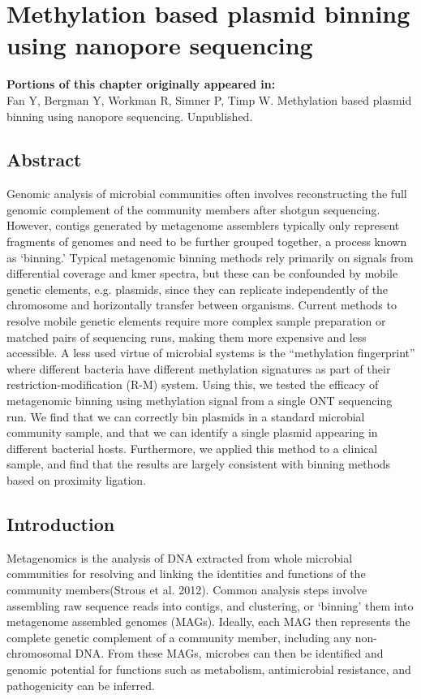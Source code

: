 \chapter{Methylation based plasmid binning using nanopore sequencing}
\label{chap:mdr}

\textbf{Portions of this chapter originally appeared in:} \\
Fan Y, Bergman Y, Workman R, Simner P, Timp W. Methylation based plasmid binning using nanopore sequencing. Unpublished.

\section{Abstract}
\label{sec:abstract}

Genomic analysis of microbial communities often involves reconstructing the full genomic complement of the community members after shotgun sequencing. However, contigs generated by metagenome assemblers typically only represent fragments of genomes and need to be further grouped together, a process known as ‘binning.’ Typical metagenomic binning methods rely primarily on signals from differential coverage and kmer spectra, but these can be confounded by mobile genetic elements, e.g. plasmids, since they can replicate independently of the chromosome and horizontally transfer between organisms. Current methods to resolve mobile genetic elements require more complex sample preparation or matched pairs of sequencing runs, making them more expensive and less accessible. A less used virtue of microbial systems is the “methylation fingerprint” where different bacteria have different methylation signatures as part of their restriction-modification (R-M) system. Using this, we tested the efficacy of metagenomic binning using methylation signal from a single ONT sequencing run. We find that we can correctly bin plasmids in a standard microbial community sample, and that we can identify a single plasmid appearing in different bacterial hosts. Furthermore, we applied this method to a clinical sample, and find that the results are largely consistent with binning methods based on proximity ligation.

\section{Introduction}
\label{sec:intro}

Metagenomics is the analysis of DNA extracted from whole microbial communities for resolving and linking the identities and functions of the community members(Strous et al. 2012). Common analysis steps involve assembling raw sequence reads into contigs, and clustering, or ‘binning’ them into metagenome assembled genomes (MAGs). Ideally, each MAG then represents the complete genetic complement of a community member, including any non-chromosomal DNA. From these MAGs, microbes can then be identified and genomic potential for functions such as metabolism, antimicrobial resistance, and pathogenicity can be inferred.

